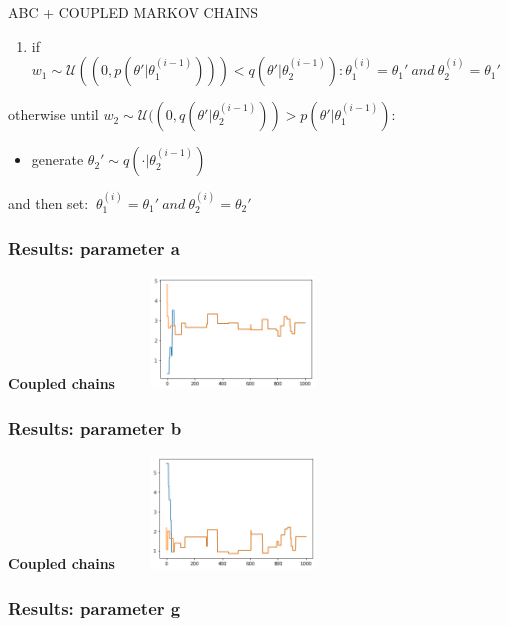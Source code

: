 \documentclass{beamer}
\begin{document}
\begin{section}{ABC + COUPLED MARKOV CHAINS}
\begin{frame}
\begin{enumerate}
	\item if $ w_{1}\sim \mathcal{U}((0, p(\theta'|\theta_{1}^{(i-1)}))) < q(\theta'|\theta_{2}^{(i-1)} ): \theta_{1}^{(i)}=\theta_{1}' \ and \ \theta_{2}^{(i)}= \theta_{1}'$
\end{enumerate}
otherwise until $ w_{2}\sim \mathcal{U}((0, q(\theta'|\theta_{2}^{(i-1)})) > p(\theta'|\theta_{1}^{(i-1)} )$:

\begin{itemize}
	\item generate $ \theta_{2}' \sim q( \cdot |\theta_{2}^{(i-1)} ) $
	
	
\end{itemize}
and then set:   $ \ \theta_{1}^{(i)}=\theta_{1}' \ and \ \theta_{2}^{(i)}= \theta_{2}'$


\end{frame}



\begin{frame}
	\frametitle{Results: parameter a}

		\begin{center}
				{\scriptsize \textbf{Coupled chains}}
				\includegraphics[width=6cm,height=3cm]{immagini_mario/a_all_chains}
			
	\end{center}
\end{frame}

\begin{frame}
	\frametitle{Results: parameter b}

			\begin{center}
				{\scriptsize \textbf{Coupled chains}}
				\includegraphics[width=6cm,height=3cm]{immagini_mario/b_all_chains}
			\end{center}

\end{frame}
\begin{frame}
	\frametitle{Results: parameter g}
	\begin{center}
	

\end{center}
\end{frame}
\end{section}
\end{document}
